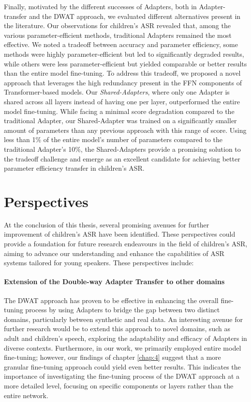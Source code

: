 Finally, motivated by the different successes of Adapters, both in Adapter-transfer and the \ac{DWAT} approach, we evaluated different alternatives present in the literature. Our observations for children's \ac{ASR} revealed that, among the various parameter-efficient methods, traditional Adapters remained the most effective. We noted a tradeoff between accuracy and parameter efficiency, some methods were highly parameter-efficient but led to significantly degraded results, while others were less parameter-efficient but yielded comparable or better results than the entire model fine-tuning. To address this tradeoff, we proposed a novel approach that leverages the high redundancy present in the \ac{FFN} components of Transformer-based models. Our \textit{Shared-Adapters}, where only one Adapter is shared across all layers instead of having one per layer, outperformed the entire model fine-tuning. While facing a minimal score degradation compared to the traditional Adapter, our Shared-Adapter was trained on a significantly smaller amount of parameters than any previous approach with this range of score. Using less than 1\% of the entire model's number of parameters compared to the traditional Adapter's 10\%, the Shared-Adapters provide a promising solution to the tradeoff challenge and emerge as an excellent candidate for achieving better parameter efficiency transfer in children's \ac{ASR}.

\section{Perspectives}
At the conclusion of this thesis, several promising avenues for further improvement of children's \ac{ASR} have been identified. These perspectives could provide a foundation for future research endeavours in the field of children's \ac{ASR}, aiming to advance our understanding and enhance the capabilities of \ac{ASR} systems tailored for young speakers. These perspectives include:

\paragraph*{Extension of the Double-way Adapter Transfer to other domains} The \ac{DWAT} approach has proven to be effective in enhancing the overall fine-tuning process by using Adapters to bridge the gap between two distinct domains, particularly between synthetic and real data. An interesting avenue for further research would be to extend this approach to novel domains, such as adult and children's speech, exploring the adaptability and efficacy of Adapters in diverse contexts. Furthermore, in our work, we primarily employed entire model fine-tuning; however, our findings of chapter \ref{chap:4} suggest that a more granular fine-tuning approach could yield even better results. This indicates the importance of investigating the fine-tuning process of the \ac{DWAT} approach at a more detailed level, focusing on specific components or layers rather than the entire network. 

